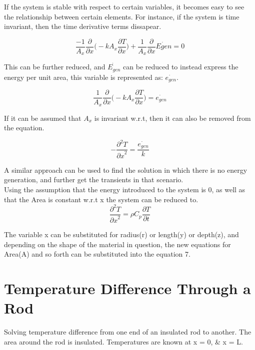 \documentclass[•]{article}
\begin{document}
If the system is stable with respect to certain variables, it becomes easy to see the relationship between certain elements. For instance, if the system is time invariant, then the time derivative terms dissapear.

\begin{equation}
\frac{-1}{A_x}\frac{\partial}{\partial x} \Big(-kA_x\frac{\partial T}{\partial x}\Big) + \frac{1}{A_x}\frac{\partial}{\partial x}{\dot{Egen}} = 0
\end{equation}

This can be further reduced, and $\dot{E_{gen}}$ can be reduced to instead express the energy per unit area, this variable is represented as: $\dot{e_{gen}}$.

\begin{equation}
\frac{1}{A_x}\frac{\partial}{\partial x} \Big(-kA_x\frac{\partial T}{\partial x}\Big) = \dot{e_{gen}}
\end{equation}

If it can be assumed that $A_x$ is invariant w.r.t, then it can also be removed from the equation.

\begin{equation}
-\frac{\partial^2 T}{{\partial x}^2} = \frac{\dot{e_{gen}}}{k}
\end{equation}

A similar approach can be used to find the solution in which there is no energy generation, and further get the transients in that scenario.\\

Using the assumption that the energy introduced to the system is 0, as well as that the Area is constant w.r.t x the system can be reduced to.
\begin{equation}
\frac{\partial^2 T}{{\partial x}^2} = \rho C_p\frac{\partial T}{\partial t}
\end{equation}

The variable x can be substituted for radius(r) or length(y) or depth(z), and depending on the shape of the material in question, the new equations for Area(A) and so forth can be substituted into the equation 7.

\section*{Temperature Difference Through a Rod}
Solving temperature difference from one end of an insulated rod to another. The area around the rod is insulated. Temperatures are known at x = 0, \& x = L.\\
\end{document}
